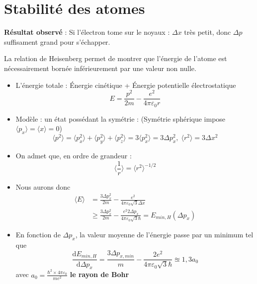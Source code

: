 


\newpage
\section{Stabilité des atomes} %
\textbf{Résultat observé} : Si l'électron tome sur le noyaux : $\Delta x$ très petit, donc $\Delta p$ suffisament grand pour s'échapper.

La relation de Heisenberg permet de montrer que l'énergie de l'atome est nécessairement bornée inférieurement par une valeur non nulle. 

\begin{itemize}

    \item L'énergie totale : Énergie cinétique + Énergie potentielle électrostatique 
      \begin{equation}
        E = \frac{p ^{2}}{2m}  - \frac{e ^{2}}{4 \pi \varepsilon_0 r} 
      \end{equation}

    \item Modèle : un état possédant la symétrie : (Symétrie sphérique impose $\langle p_x \rangle= \langle x \rangle = 0$)
      \begin{equation}
        \langle p ^{2} \rangle = \langle p_x ^{2}\rangle + \langle p_y ^{2} \rangle + \langle p_z ^{2} \rangle = 3 \langle p_x ^{2} \rangle = 3 \Delta p_x ^{2},\; \langle r ^{2} \rangle = 3 \Delta x ^{2}
      \end{equation}


    \item On admet que, en ordre de grandeur : 
      \begin{equation}
        \langle \frac{1}{r}   \rangle = \langle r ^{2} \rangle ^{-1 /2} 
      \end{equation}

    \item Nous aurons donc 
      \begin{align}
        \langle E \rangle &= \frac{3 \Delta p _x ^{2}}{2m}  - \frac{
          e ^{2}
        }{4 \pi \varepsilon_0 \sqrt{3} \Delta x} \\ 
                          &\ge \frac{3 \Delta p_x ^{2}}{2m}  - \frac{e ^{2} 2 \Delta p_x}{4 \pi \varepsilon_0 \sqrt{3} \hbar}  = E _{min,H}( \Delta p_x)
      \end{align}

    \item En fonction de $\Delta p_x$, la valeur moyenne de l'énergie passe par un minimum tel que 
      \begin{equation}
        \frac{\mathrm{d} E _{min, H}}{\mathrm{d} \Delta p_x}  = \frac{3 \Delta p _{x, min}}{m}  - \frac{2 e ^{2}}{ 4 \pi \varepsilon_0 \sqrt{3} \hbar}  \approxeq 1,3 a_0
      \end{equation}
      avec $a_0 = \frac{\hbar ^{2} \times 4 \pi \varepsilon_0}{ m e ^{2}}$ \textbf{le rayon de Bohr}


\end{itemize}
